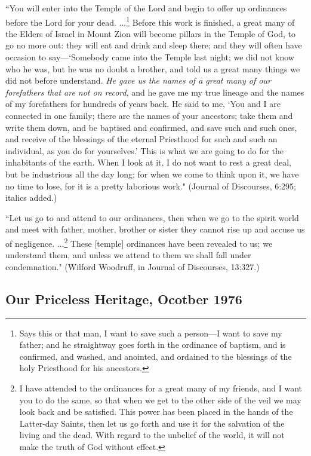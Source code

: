 ``You will enter into the Temple of the Lord and begin to offer up ordinances before the Lord for your dead. ...\footnote{Says this or that man, I want to save such a person—I want to save my father; and he straightway goes forth in the ordinance of baptism, and is confirmed, and washed, and anointed, and ordained to the blessings of the holy Priesthood for his ancestors.} Before this work is finished, a great many of the Elders of Israel in Mount Zion will become pillars in the Temple of God, to go no more out: they will eat and drink and sleep there; and they will often have occasion to say—`Somebody came into the Temple last night; we did not know who he was, but he was no doubt a brother, and told us a great many things we did not before understand. \textit{He gave us the names of a great many of our forefathers that are not on record}, and he gave me my true lineage and the names of my forefathers for hundreds of years back. He said to me, `You and I are connected in one family; there are the names of your ancestors; take them and write them down, and be baptised and confirmed, and save such and such ones, and receive of the blessings of the eternal Priesthood for such and such an individual, as you do for yourselves.' This is what we are going to do for the inhabitants of the earth. When I look at it, I do not want to rest a great deal, but be industrious all the day long; for when we come to think upon it, we have no time to lose, for it is a pretty laborious work." (Journal of Discourses, 6:295; italics added.)

``Let us go to and attend to our ordinances, then when we go to the spirit world and meet with father, mother, brother or sister they cannot rise up and accuse us of negligence. ...\footnote{I have attended to the ordinances for a great many of my friends, and I want you to do the same, so that when we get to the other side of the veil we may look back and be satisfied. This power has been placed in the hands of the Latter-day Saints, then let us go forth and use it for the salvation of the living and the dead. With regard to the unbelief of the world, it will not make the truth of God without effect.} These [temple] ordinances have been revealed to us; we understand them, and unless we attend to them we shall fall under condemnation." (Wilford Woodruff, in Journal of Discourses, 13:327.)

\subsection{Our Priceless Heritage, Ocotber 1976}

